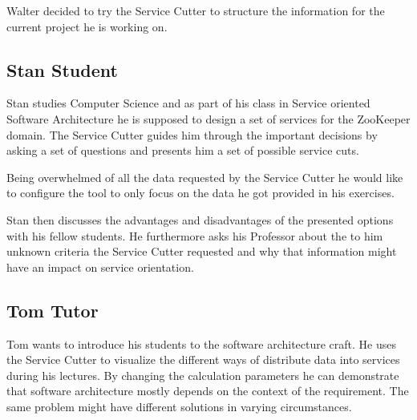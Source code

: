Walter decided to try the Service Cutter to structure the information for the current project he is working on.



\subsection{Stan Student}

Stan studies Computer Science and as part of his class in Service oriented Software Architecture he is supposed to design a set of services for the ZooKeeper domain. The Service Cutter guides him through the important decisions by asking a set of questions and presents him a set of possible service cuts. 

Being overwhelmed of all the data requested by the Service Cutter he would like to configure the tool to only focus on the data he got provided in his exercises. 

Stan then discusses the advantages and disadvantages of the presented options with his fellow students. He furthermore asks his Professor about the to him unknown criteria the Service Cutter requested and why that information might have an impact on service orientation. 


\subsection{Tom Tutor}

Tom wants to introduce his students to the software architecture craft. He uses the Service Cutter to visualize the different ways of distribute data into services during his lectures. By changing the calculation parameters he can demonstrate that software architecture mostly depends on the context of the requirement. The same problem might have different solutions in varying circumstances.
